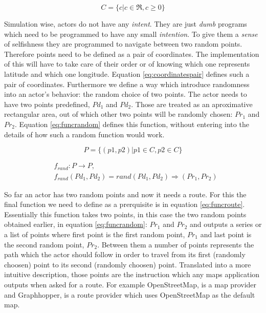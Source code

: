 \documentclass[a4paper,12pt,twoside]{book}
\begin{document}
\begin{equation}
\label{eq:coordinates}
    C = \{ c | c \in \Re, c \geq 0 \}
\end{equation}

Simulation wise, actors do not have any \textit{intent}. They are just \textit{dumb} programs which need to be programmed to have any small \textit{intention}. To give them a \textit{sense} of selfishness they are programmed to navigate between two random points. Therefore points need to be defined as a pair of coordinates. The implementation of this will have to take care of their order or of knowing which one represents latitude and which one longitude. Equation \ref{eq:coordinatespair} defines such a pair of coordinates. Furthermore we define a way which introduce randomness into an actor's behavior: the random choice of two points. The actor needs to have two points predefined, $Pd_1$ and $Pd_2$. Those are treated as an aproximative rectangular area, out of which other two points will be randomly chosen: $Pr_1$ and $Pr_2$. Equation \ref{eq:funcrandom} defines this function, without entering into the details of how such a random function would work.

\begin{equation}
\label{eq:coordinatespair}
    P = \{ (p1, p2) | p1 \in C, p2 \in C \}
\end{equation}

\begin{equation}
\label{eq:funcrandom}
\begin{split}
    & f_{rand}: P \rightarrow P, \\
    & f_{rand}(Pd_1, Pd_2) = rand (Pd_1, Pd_2) \Rightarrow (Pr_1, Pr_2)
\end{split}
\end{equation}

So far an actor has two random points and now it needs a route. For this the final function we need to define as a prerquisite is in equation \ref{eq:funcroute}. Essentially this function takes two points, in this case the two random points obtained earlier, in equation \ref{eq:funcrandom}: $Pr_1$ and $Pr_2$ and outputs a series or a list of points where first point is the first random point, $Pr_1$ and last point is the second random point, $Pr_2$. Between them a number of points represents the path which the actor should follow in order to travel from its first (randomly choosen) point to its second (randomly choosen) point. Translated into a more intuitive description, those points are the instruction which any maps application outputs when asked for a route. For example OpenStreetMap, \cite{openstreetmap} is a map provider and Graphhopper, \cite{graphhopper} is a route provider which uses OpenStreetMap as the default map.
\end{document}
